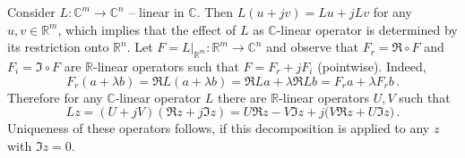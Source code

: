 \documentclass[a4paper,10pt]{article}
\newcommand{\real}{\mathbb{R}}
\newcommand{\cplx}{\mathbb{C}}
\begin{document}
Consider $L \colon \cplx^m \to \cplx^n$ -- linear in $\cplx$. Then $
  L(u + jv) = L u + j L v
$ for any $u, v \in \real^m$, which implies that the effect of $L$ as $\cplx$-linear
operator is determined by its restriction onto $\real^n$. Let $
  F = L\vert_{\real^m}
  \colon \real^m \to \cplx^n
$ and observe that $F_r = \Re \circ F$ and $F_i = \Im \circ F$ are $\real$-linear operators
such that $F = F_r + j F_i$ (pointwise). Indeed,
$$
  F_r(a + \lambda b)
  = \Re L(a + \lambda b)
  = \Re L a + \lambda \Re L b
  = F_r a + \lambda F_r b
  \,. $$
Therefore for any $\cplx$-linear operator $L$ there are $\real$-linear operators $U, V$
such that
$$
L z 
  = (U + j V) (\Re z + j \Im z)
  = U \Re z - V \Im z + j \bigl( V \Re z + U \Im z \bigr)
  \,. $$
Uniqueness of these operators follows, if this decomposition is applied to any $z$ with
$\Im z = 0$.


\end{document}

